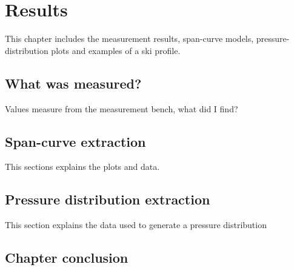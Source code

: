 \chapter{Results}
This chapter includes the measurement results, span-curve models, pressure-distribution plots and examples of a ski profile.

\section{What was measured?}
Values measure from the measurement bench, what did I find?

\section{Span-curve extraction}
This sections explains the plots and data.

\section{Pressure distribution extraction}
This section explains the data used to generate a pressure distribution

\section{Chapter conclusion}
